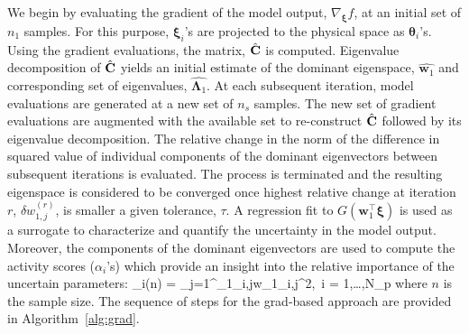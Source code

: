 We begin by evaluating the gradient of the model output, $\nabla_{\bm{\xi}}f$, at an initial set of $n_1$ samples. 
For this purpose, $\bm{\xi}_i$'s are projected to the physical space as $\bm{\theta}_i$'s. Using the gradient
evaluations, the matrix, $\hat{\mathbf{{C}}}$ is computed. Eigenvalue decomposition of $\hat{\mathbf{{C}}}$ yields an initial
estimate of the dominant eigenspace, $\hat{\bm{w}_1}$ and corresponding set of eigenvalues, $\hat{\bm{\Lambda}_1}$.
At each subsequent iteration, model evaluations are generated at a new set of $n_s$ samples. The new set
of gradient evaluations are augmented with the available set to re-construct $\hat{\mathbf{{C}}}$ followed by its eigenvalue
decomposition. The relative
change in the norm of the difference in squared value of individual components of the dominant eigenvectors between subsequent 
iterations is evaluated. The process is terminated and the resulting eigenspace is considered to be converged once
highest relative change at iteration $r$, $\delta w_{1,j}^{(r)}$, is smaller a given tolerance, $\tau$. A regression fit to
 $G(\bm{w}_1^\top\bm{\xi})$ is used as a surrogate to characterize and quantify the uncertainty in the model
 output. Moreover, the components of the dominant eigenvectors are used to compute the activity scores ($\alpha_i$'s)
 which provide an insight into the relative importance of the uncertain parameters:
 \be
\alpha_i(n) = \sum\limits_{j=1}^{}\Lambda_{1_{i,j}}w_{1_{i,j}}^2,~i = 1,\ldots,N_p
\label{eq:as}
\ee
%
where $n$ is the sample size. The sequence of steps for the grad-based approach are provided in 
Algorithm~\ref{alg:grad}.


